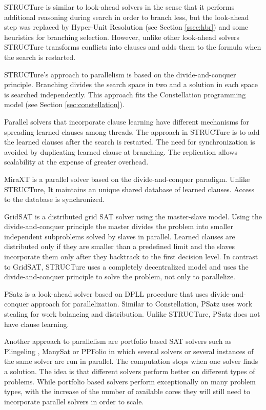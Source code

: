 STRUCTure is similar to look-ahead solvers in the sense that it
performs additional reasoning during search in order to branch less,
but the look-ahead step was replaced by Hyper-Unit Resolution (see
Section \ref{ssec:hbr}) and some heuristics for branching selection.
However, unlike other look-ahead solvers STRUCTure transforms
conflicts into clauses and adds them to the formula when the search
is restarted.

STRUCTure's approach to parallelism is based on the
divide-and-conquer principle. Branching divides the search space in
two and a solution in each space is searched independently. This
approach fits the Constellation programming model (see Section
\ref{sec:constellation}).

Parallel solvers that incorporate clause learning have different
mechanisms for spreading learned clauses among threads. The approach
in STRUCTure is to add the learned clauses after the search is
restarted. The need for synchronization is avoided by duplicating
learned clause at branching. The replication allows scalability at
the expense of greater overhead.

MiraXT \cite{mine:miraxt} is a parallel solver based on the
divide-and-conquer paradigm. Unlike STRUCTure, It maintains an
unique shared database of learned clauses. Access to the database
is synchronized.

GridSAT \cite{Chrabakh:2003:GCD:1048935.1050188} is a distributed
grid SAT solver using the master-slave model. Using the
divide-and-conquer principle the master divides the problem into
smaller independent subproblems solved by slaves in parallel. Learned
clauses are distributed only if they are smaller than a predefined
limit and the slaves incorporate them only after they backtrack to
the first decision level. In contrast to GridSAT, STRUCTure uses
a completely decentralized model and uses the divide-and-conquer
principle to solve the problem, not only to parallelize.

PSatz \cite{Jurkowiak_aparallelization} is a look-ahead solver
based on DPLL procedure that uses divide-and-conquer approach for
parallelization. Similar to Constellation, PSatz uses work stealing
for work balancing and distribution. Unlike STRUCTure, PSatz does
not have clause learning.

Another approach to parallelism are portfolio based SAT
solvers such as Plingeling \cite{mine:plingeling}, ManySat
\cite{Hamadi09manysat:a} or PPFolio \cite{mine:ppfolio} in which
several solvers or several instances of the same solver are run in
parallel. The computation stops when one solver finds a solution. The
idea is that different solvers perform better on different types
of problems. While portfolio based solvers perform exceptionally
on many problem types, with the increase of the number of available
cores they will still need to incorporate parallel solvers in order
to scale.

